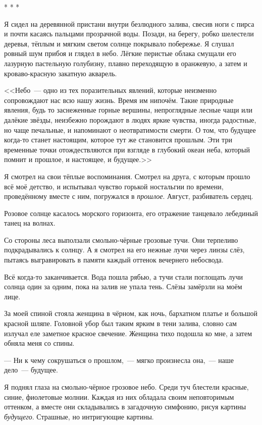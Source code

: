 \documentclass[openany, oneside]{book}
\begin{document}
\begin{center}
    * * *
\end{center}

Я сидел на деревянной пристани внутри безлюдного залива, свесив ноги с пирса и почти касаясь пальцами прозрачной воды. Позади, на берегу, робко шелестели деревья, тёплым и мягким светом солнце покрывало побережье. Я слушал ровный шум прибоя и глядел в небо. Лёгкие перистые облака смущали его лазурную пастельную голубизну, плавно переходящую в оранжевую, а затем и кроваво-красную закатную акварель. 

<<Небо~--- одно из тех поразительных явлений, которые неизменно сопровождают нас всю нашу жизнь. Время им нипочём. Такие природные явления, будь то заснеженные горные вершины, непроглядные лесные чащи или далёкие звёзды, неизбежно порождают в людях яркие чувства, иногда радостные, но чаще печальные, и напоминают о неотвратимости смерти. О том, что будущее когда-то станет настоящим, которое тут же становится прошлым. Эти три временные точки отождествляются при взгляде в глубокий океан неба, который помнит и прошлое, и настоящее, и будущее.>>

Я смотрел на свои тёплые воспоминания. Смотрел на друга, с которым прошло всё моё детство, и испытывал чувство горькой ностальгии по времени, проведённому вместе с ним, погружался в \textit{прошлое}. Август, разбиватель сердец.

Розовое солнце касалось морского горизонта, его отражение танцевало лебединый танец на волнах.

Со стороны леса выползали смольно-чёрные грозовые тучи. Они терпеливо подкрадывались к солнцу. А я смотрел на его нежные лучи через линзы слёз, пытаясь выгравировать в памяти каждый оттенок вечернего небосвода.

Всё когда-то заканчивается. Вода пошла рябью, а тучи стали поглощать лучи солнца один за одним, пока на залив не упала тень. Слёзы замёрзли на моём лице.

За моей спиной стояла женщина в чёрном, как ночь, бархатном платье и большой красной шляпе. Головной убор был таким ярким в тени залива, словно сам излучал еле заметное красное свечение. Женщина тихо подошла ко мне, а затем обняла меня со спины.

--- Ни к чему сокрушаться о прошлом,~--- мягко произнесла она,~--- наше дело~--- будущее.

Я поднял глаза на смольно-чёрное грозовое небо. Среди туч блестели красные, синие, фиолетовые молнии. Каждая из них обладала своим неповторимым оттенком, а вместе они складывались в загадочную симфонию, рисуя картины \textit{будущего}. Страшные, но интригующие картины.
\end{document}

